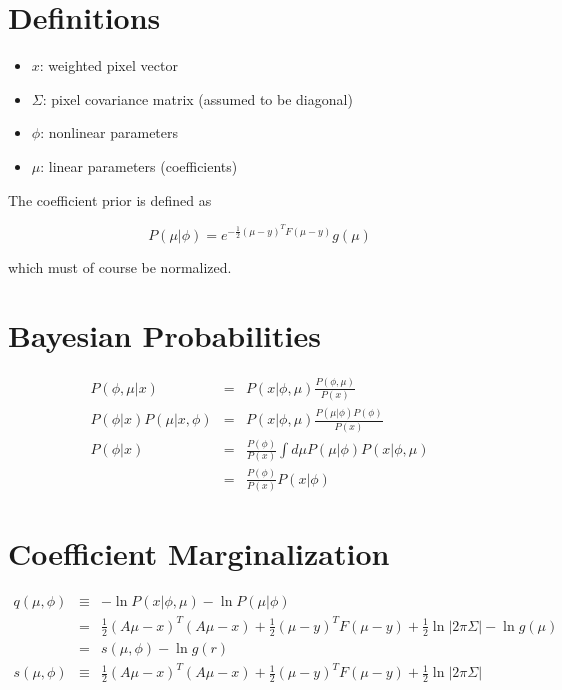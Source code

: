 \documentclass{amsart}
\begin{document}
\section{Definitions}

\begin{itemize}
\item $x$: weighted pixel vector
\item $\Sigma$: pixel covariance matrix (assumed to be diagonal)
\item $\phi$: nonlinear parameters
\item $\mu$: linear parameters (coefficients)
\end{itemize}

The coefficient prior is defined as

\begin{equation}
  P(\mu|\phi) = e^{-\frac{1}{2}(\mu-y)^T F (\mu-y)} g(\mu)
\end{equation}

which must of course be normalized.

\section{Bayesian Probabilities}

\begin{eqnarray}
  P(\phi,\mu|x) &=& P(x|\phi,\mu)
  \frac{P(\phi,\mu)}{P(x)} \\
  P(\phi|x)P(\mu|x,\phi) &=&
  P(x|\phi,\mu)\frac{P(\mu|\phi) P(\phi)}{P(x)}
  \\
  P(\phi|x) &=& \frac{P(\phi)}{P(x)}
  \int d\mu P(\mu|\phi) P(x|\phi,\mu) \\
  &=& \frac{P(\phi)}{P(x)} P(x|\phi)
\end{eqnarray}

\section{Coefficient Marginalization}

\begin{eqnarray}
  q(\mu,\phi) &\equiv& -\ln P(x|\phi,\mu) 
  - \ln P(\mu|\phi) \\ &=& 
  \frac{1}{2}(A\mu - x)^T\!(A\mu - x)
  + \frac{1}{2} \left(\mu - y\right)^T\! 
  F \left(\mu - y\right) + \frac{1}{2}\ln\left|2\pi\Sigma\right|
  - \ln g(\mu) \\
  &=& s(\mu,\phi) - \ln g(r) \\
  s(\mu,\phi) &\equiv& \frac{1}{2}(A\mu - x)^T\!(A\mu - x)
  + \frac{1}{2} \left(\mu - y\right)^T\! 
  F \left(\mu - y\right) + \frac{1}{2}\ln\left|2\pi\Sigma\right|
\end{eqnarray}
\end{document}

